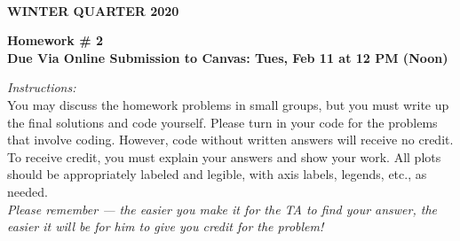 \documentclass[12pt]{article}
\begin{document}
\\
{\bf WINTER QUARTER 2020}\\


\vspace{5mm}

\begin{center}
{\bf Homework \# 2}\\
{\bf Due Via Online Submission to Canvas: Tues, Feb 11 at 12 PM (Noon) }
\end{center}
\vspace{10mm}

\noindent \emph{Instructions:}\\

 You may discuss the homework problems in small groups, but you must write up the final solutions and code yourself. 
Please turn in your code for the problems that involve coding.  However, code without written answers will receive no credit. To receive credit, you must explain your answers and show your work. All plots should be appropriately labeled and legible, with axis labels, legends, etc., as needed. \\

\emph{Please remember --- the easier you make it for the TA to find your answer, the easier it will be for him to give you credit for the problem!} 


\vspace{10mm}
\end{document}
